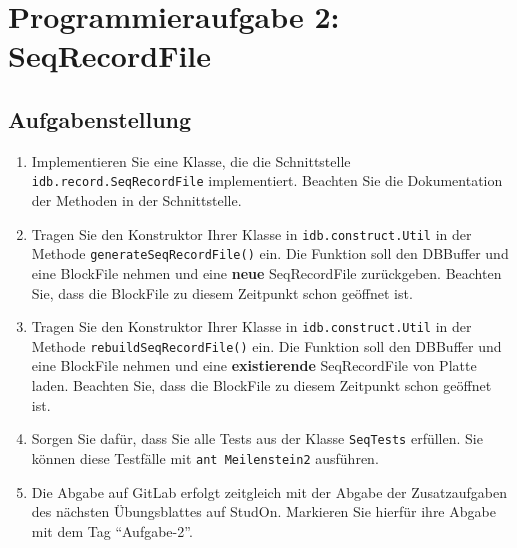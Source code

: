 \section{Programmieraufgabe 2: SeqRecordFile}

\subsection{Aufgabenstellung}
\begin{enumerate}
	\item Implementieren Sie eine Klasse, die die Schnittstelle \beamertxt{\linebreak}\texttt{idb.record.SeqRecordFile} implementiert.
		Beachten Sie die Dokumentation der Methoden in der Schnittstelle.
	\item Tragen Sie den Konstruktor Ihrer Klasse in \texttt{idb.construct.Util} in der Methode \texttt{generateSeqRecordFile()} ein.
		Die Funktion soll den DBBuffer und eine BlockFile nehmen und eine \textbf{neue} SeqRecordFile zurückgeben.
		Beachten Sie, dass die BlockFile zu diesem Zeitpunkt schon geöffnet ist.
	\item Tragen Sie den Konstruktor Ihrer Klasse in \texttt{idb.construct.Util} in der Methode \texttt{rebuildSeqRecordFile()} ein.
		Die Funktion soll den DBBuffer und eine BlockFile nehmen und eine \textbf{existierende} SeqRecordFile von Platte laden.
		Beachten Sie, dass die BlockFile zu diesem Zeitpunkt schon geöffnet ist.
	\item Sorgen Sie dafür, dass Sie alle Tests aus der Klasse \texttt{SeqTests} erfüllen.
	Sie können diese Testfälle mit \lstinline|ant Meilenstein2| ausführen.
	\item Die Abgabe auf GitLab erfolgt zeitgleich mit der Abgabe der Zusatzaufgaben des nächsten Übungsblattes auf StudOn. Markieren Sie hierfür ihre Abgabe mit dem Tag "`Aufgabe-2"'.
\end{enumerate}

